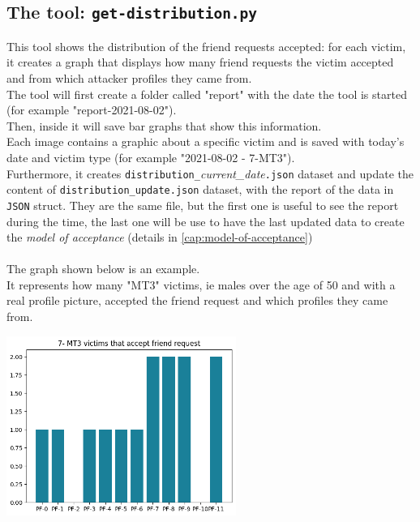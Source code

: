 \subsection{The tool: \texttt{get-distribution.py}}
\label{cap:distribution-update}
This tool shows the distribution of the friend requests accepted: for each victim, it creates a graph that displays how many friend requests the victim accepted and from which attacker profiles they came from.\\
The tool will first create a folder called "report" with the date the tool is started (for example "report-2021-08-02").\\
Then, inside it will save bar graphs that show this information.\\
Each image contains a graphic about a specific victim and is saved with today's date and victim type (for example "2021-08-02 - 7-MT3").\\
Furthermore, it creates \texttt{distribution\_}\textit{current\_date}\texttt{.json} dataset and update the content of \texttt{distribution\_update.json} dataset, with the report of the data in \texttt{JSON} struct. They are the same file, but the first one is useful to see the report during the time, the last one will be use to have the last updated data to create the \textit{model of acceptance} (details in \ref{cap:model-of-acceptance})\\\\
The graph shown below is an example.\\
It represents how many "MT3" victims, ie males over the age of 50 and with a real profile picture, accepted the friend request and which profiles they came from.\\
\begin{center}
	\includegraphics[width=7.5cm]{immagini/2021-08-02 - 7-MT3.png} 
\end{center}
